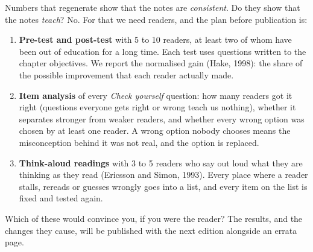 Numbers that regenerate show that the notes are \emph{consistent}. Do they show that the notes
\emph{teach}? No. For that we need readers, and the plan before publication is:
\begin{enumerate}
\item \textbf{Pre-test and post-test} with 5 to 10 readers, at least two of whom have been out of
education for a long time. Each test uses questions written to the chapter objectives. We report the
normalised gain (Hake, 1998): the share of the possible improvement that each reader actually made.
\item \textbf{Item analysis} of every \emph{Check yourself} question: how many readers got it right
(questions everyone gets right or wrong teach us nothing), whether it separates stronger from weaker
readers, and whether every wrong option was chosen by at least one reader. A wrong option nobody chooses
means the misconception behind it was not real, and the option is replaced.
\item \textbf{Think-aloud readings} with 3 to 5 readers who say out loud what they are thinking as they
read (Ericsson and Simon, 1993). Every place where a reader stalls, rereads or guesses wrongly goes into
a list, and every item on the list is fixed and tested again.
\end{enumerate}
Which of these would convince you, if you were the reader? The results, and the changes they cause, will be published with the next edition alongside an errata
page.
